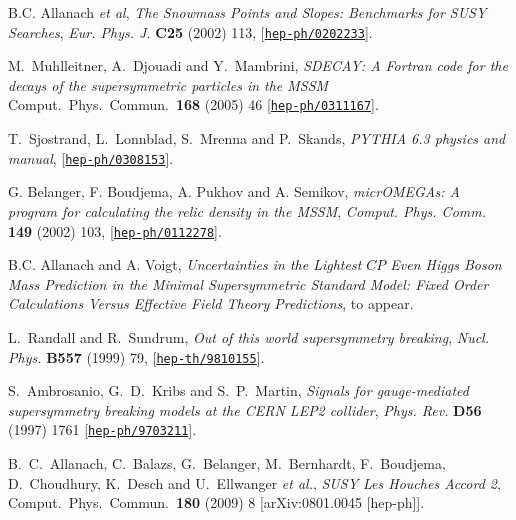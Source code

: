 \documentclass{article}
\begin{document}
\begin{thebibliography}{10}
B.C. Allanach {\em et al}, {\it The Snowmass Points and Slopes: Benchmarks for
  SUSY Searches}, {\em Eur. Phys. J.} {\bf C25} (2002) 113,
 [\href{http://xxx.lanl.gov/abs/hep-ph/0202233}{{\tt hep-ph/0202233}}].


M.~Muhlleitner, A.~Djouadi and Y.~Mambrini,
{\em SDECAY: A Fortran code for the decays of the supersymmetric particles in the
MSSM} 
Comput.\ Phys.\ Commun.\  {\bf 168} (2005) 46
[\href{http://xxx.lanl.gov/abs/hep-ph/0311167}{{\tt hep-ph/0311167}}].

T.~Sjostrand, L.~Lonnblad, S.~Mrenna and P.~Skands,
{\em PYTHIA 6.3 physics and manual}, 
[\href{http://xxx.lanl.gov/abs/hep-ph/0308153}{{\tt hep-ph/0308153}}].

G. Belanger, F. Boudjema, A. Pukhov and A. Semikov,
{\it micrOMEGAs: A program for calculating the relic density in the MSSM},
{\em Comput. Phys. Comm.} {\bf 149} (2002) 103,
  [\href{http://xxx.lanl.gov/abs/hep-ph/0112278}{{\tt hep-ph/0112278}}].

B.C. Allanach and A. Voigt,
{\em Uncertainties in the Lightest $CP$ Even Higgs Boson Mass Prediction in the
  Minimal Supersymmetric Standard Model: Fixed Order Calculations Versus 
  Effective Field Theory Predictions}, to appear.

L.~Randall and R.~Sundrum, {\it Out of this world supersymmetry breaking},
  {\em Nucl. Phys.} {\bf B557} (1999) 79,
  [\href{http://xxx.lanl.gov/abs/hep-th/9810155}{{\tt hep-th/9810155}}].

S.~Ambrosanio, G.~D.~Kribs and S.~P.~Martin,
{\it Signals for gauge-mediated supersymmetry breaking models at the CERN
LEP2 collider}, 
{\em Phys. Rev.} {\bf D56} (1997) 1761
  [\href{http://xxx.lanl.gov/abs/hep-ph/9703211}{{\tt hep-ph/9703211}}].

B.~C.~Allanach, C.~Balazs, G.~Belanger, M.~Bernhardt, F.~Boudjema, D.~Choudhury, K.~Desch and U.~Ellwanger {\it et al.},
  {\em SUSY Les Houches Accord 2},
  Comput.\ Phys.\ Commun.\  {\bf 180} (2009) 8
  [arXiv:0801.0045 [hep-ph]].
\end{thebibliography}\endgroup
\end{document}
